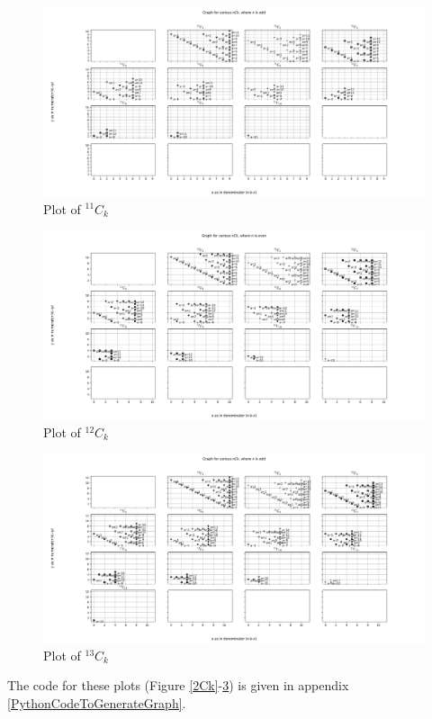 \documentclass[12pt, twoside]{article}
\newcommand*{\Combination}[2]{{}^{#1}C_{#2}}%
\begin{document}
\begin{figure}[ph!]	
	\includegraphics[width=\linewidth]{11Ck.png}
	\caption{Plot of $\Combination{11}{k}$}
	\label{11Ck}									
\end{figure}
\begin{figure}[ph!]	
	\includegraphics[width=\linewidth]{12Ck.png}
	\caption{Plot of $\Combination{12}{k}$}
	\label{12Ck}
\end{figure}	
\begin{figure}[ph!]	
	\includegraphics[width=\linewidth]{13Ck.png}
	\caption{Plot of $\Combination{13}{k}$}
	\label{13Ck}									
\end{figure}\newline
The code for these plots (Figure \ref{2Ck}-\ref{13Ck}) is given in appendix \ref{PythonCodeToGenerateGraph}.
\end{document}
